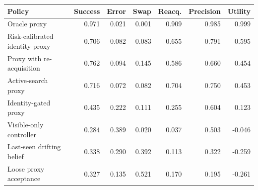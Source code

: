 \begin{tabular}{lrrrrrr}
\toprule
Policy & Success & Error & Swap & Reacq. & Precision & Utility \\
\midrule
Oracle proxy & 0.971 & 0.021 & 0.001 & 0.909 & 0.985 & 0.999 \\
Risk-calibrated identity proxy & 0.706 & 0.082 & 0.083 & 0.655 & 0.791 & 0.595 \\
Proxy with re-acquisition & 0.762 & 0.094 & 0.145 & 0.586 & 0.660 & 0.454 \\
Active-search proxy & 0.716 & 0.072 & 0.082 & 0.704 & 0.750 & 0.453 \\
Identity-gated proxy & 0.435 & 0.222 & 0.111 & 0.255 & 0.604 & 0.123 \\
Visible-only controller & 0.284 & 0.389 & 0.020 & 0.037 & 0.503 & -0.046 \\
Last-seen drifting belief & 0.338 & 0.290 & 0.392 & 0.113 & 0.322 & -0.259 \\
Loose proxy acceptance & 0.327 & 0.135 & 0.521 & 0.170 & 0.195 & -0.261 \\
\bottomrule
\end{tabular}
